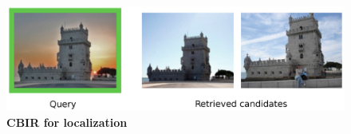 \begin{figure}[t]
	\centering

	\includegraphics[width=0.5\linewidth]{methods/indirect.png}
	\caption[CBIR for localization]{\textbf{CBIR for localization} \label{fig:cbir_for_localization}}
\end{figure}
